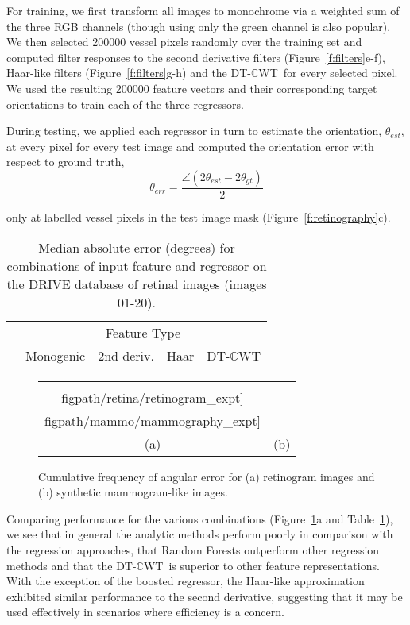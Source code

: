\documentclass{bmvc2k}
\newcommand{\fref}[1]{Figure~\ref{#1}}
\newcommand{\tref}[1]{Table~\ref{#1}}
\def\dtcwt{DT-$\mathbb{C}$WT}
\newcommand{\comment}[1]{}
\begin{document}
For training, we first transform all images to monochrome via a weighted sum of the three RGB channels (though using only the green channel is also popular). We then selected 200000 vessel pixels randomly over the training set and computed filter responses to the second derivative filters (\fref{f:filters}e-f), Haar-like filters (\fref{f:filters}g-h) and the \dtcwt~for every selected pixel. We used the resulting 200000 feature vectors and their corresponding target orientations to train each of the three regressors.

During testing, we applied each regressor in turn to estimate the orientation, $\theta_{est}$, at every pixel for every test image and computed the orientation error with respect to ground truth,
%
\begin{equation}
	\theta_{err} = \frac{\angle(2\theta_{est}-2\theta_{gt})}{2}
\end{equation}

\noindent only at labelled vessel pixels in the test image mask (\fref{f:retinography}c).\comment{A reviewer will probably complain that this is cheating and that we should have used a classifier}

\begin{table}[b]
\centering
\begin{tabular}{l|c c c c}
							& \multicolumn{4}{c}{Feature Type} \\
							& Monogenic		& 2nd deriv.	& Haar				& \dtcwt \\
\hline

\end{tabular}
%
\caption{Median absolute error (degrees) for combinations of input feature and regressor on the DRIVE database of retinal images (images 01-20).}
\label{t:retinopathy}
\end{table}

\begin{figure}
\centering
\begin{tabular}{c c}
\texttt{[image: \\figpath/retina/retinogram\_expt]} &
\texttt{[image: \\figpath/mammo/mammography\_expt]} \\
(a) & (b) \\
\end{tabular}
%
\caption{Cumulative frequency of angular error for (a) retinogram images and (b) synthetic mammogram-like images.}
\label{f:cumfreq}
\end{figure}

Comparing performance for the various combinations (\fref{f:cumfreq}a and \tref{t:retinopathy}), we see that in general the analytic methods perform poorly in comparison with the regression approaches, that Random Forests outperform other regression methods and that the \dtcwt~is superior to other feature representations. With the exception of the boosted regressor, the Haar-like approximation exhibited similar performance to the second derivative, suggesting that it may be used effectively in scenarios where efficiency is a concern.
\end{document}
